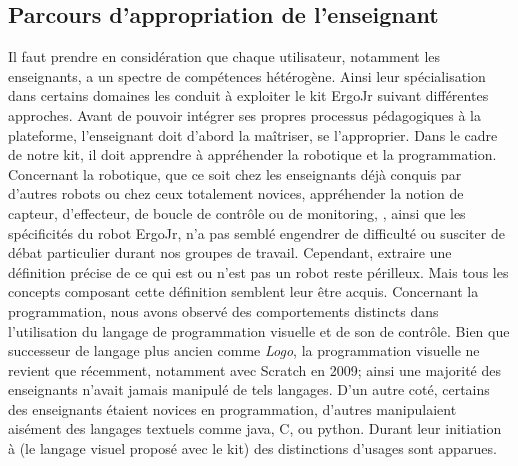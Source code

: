     \subsection{Parcours d’appropriation de l'enseignant}
        Il faut prendre en considération que chaque utilisateur, notamment les enseignants, a un spectre de compétences hétérogène. Ainsi leur
        spécialisation dans certains domaines les conduit à exploiter le kit ErgoJr suivant différentes approches. Avant de pouvoir intégrer ses propres processus pédagogiques à la plateforme, l'enseignant doit d'abord la maîtriser, se l'approprier. Dans le cadre de notre kit, il doit apprendre à appréhender la robotique et la programmation.
        Concernant la robotique, que ce soit chez les enseignants déjà conquis par d'autres robots ou chez ceux totalement novices, appréhender la notion de capteur, d'effecteur, de boucle de contrôle ou de monitoring, \etc, ainsi que les spécificités du robot ErgoJr, n'a pas semblé engendrer de difficulté ou susciter de débat particulier durant nos groupes de travail. Cependant, extraire une définition précise de ce qui est ou n'est pas un robot reste périlleux. Mais tous les concepts composant cette définition semblent leur être acquis.
        Concernant la programmation, nous avons observé des comportements distincts dans l'utilisation du langage de programmation visuelle  et de son  de contrôle.
        Bien que successeur de langage plus ancien comme \textit{Logo}, la programmation visuelle ne revient que récemment, notamment avec Scratch en 2009; ainsi une majorité des enseignants n'avait jamais manipulé de tels langages. D'un autre coté, certains des enseignants étaient novices en programmation, d'autres manipulaient aisément des langages textuels comme java, C, ou python. Durant leur initiation à  (le langage visuel proposé avec le kit) des distinctions d'usages sont apparues. \par%
